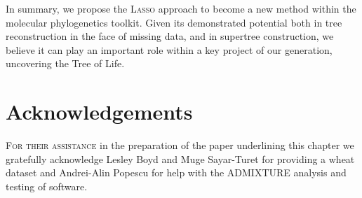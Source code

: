 In summary, we propose the \textsc{Lasso} approach to become a new method
within the molecular phylogenetics toolkit. Given its demonstrated potential
both in tree reconstruction in the face of missing data, and in supertree
construction, we believe it can play an important role within a key project of
our generation, uncovering the Tree of Life.

\section{Acknowledgements}
\label{sec:acknowledgements}

\textsc{For their assistance} in the preparation of the paper underlining this
chapter we gratefully acknowledge Lesley Boyd and Muge Sayar-Turet for
providing a wheat dataset and Andrei-Alin Popescu for help with the ADMIXTURE
analysis and testing of software.

